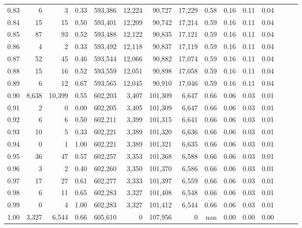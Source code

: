 \begin{tabular}{rrrrrrrrrrrrrrr}
0.83 &       6 &       3 &  0.33 &  593,386 &   12,224 &   90,727 &   17,229 &  0.58 &  0.16 &  0.11 &      0.04 \\
0.84 &      15 &      15 &  0.50 &  593,401 &   12,209 &   90,742 &   17,214 &  0.59 &  0.16 &  0.11 &      0.04 \\
0.85 &      87 &      93 &  0.52 &  593,488 &   12,122 &   90,835 &   17,121 &  0.59 &  0.16 &  0.11 &      0.04 \\
0.86 &       4 &       2 &  0.33 &  593,492 &   12,118 &   90,837 &   17,119 &  0.59 &  0.16 &  0.11 &      0.04 \\
0.87 &      52 &      45 &  0.46 &  593,544 &   12,066 &   90,882 &   17,074 &  0.59 &  0.16 &  0.11 &      0.04 \\
0.88 &      15 &      16 &  0.52 &  593,559 &   12,051 &   90,898 &   17,058 &  0.59 &  0.16 &  0.11 &      0.04 \\
0.89 &       6 &      12 &  0.67 &  593,565 &   12,045 &   90,910 &   17,046 &  0.59 &  0.16 &  0.11 &      0.04 \\
0.90 &   8,638 &  10,399 &  0.55 &  602,203 &    3,407 &  101,309 &    6,647 &  0.66 &  0.06 &  0.03 &      0.01 \\
0.91 &       2 &       0 &  0.00 &  602,205 &    3,405 &  101,309 &    6,647 &  0.66 &  0.06 &  0.03 &      0.01 \\
0.92 &       6 &       6 &  0.50 &  602,211 &    3,399 &  101,315 &    6,641 &  0.66 &  0.06 &  0.03 &      0.01 \\
0.93 &      10 &       5 &  0.33 &  602,221 &    3,389 &  101,320 &    6,636 &  0.66 &  0.06 &  0.03 &      0.01 \\
0.94 &       0 &       1 &  1.00 &  602,221 &    3,389 &  101,321 &    6,635 &  0.66 &  0.06 &  0.03 &      0.01 \\
0.95 &      36 &      47 &  0.57 &  602,257 &    3,353 &  101,368 &    6,588 &  0.66 &  0.06 &  0.03 &      0.01 \\
0.96 &       3 &       2 &  0.40 &  602,260 &    3,350 &  101,370 &    6,586 &  0.66 &  0.06 &  0.03 &      0.01 \\
0.97 &      17 &      27 &  0.61 &  602,277 &    3,333 &  101,397 &    6,559 &  0.66 &  0.06 &  0.03 &      0.01 \\
0.98 &       6 &      11 &  0.65 &  602,283 &    3,327 &  101,408 &    6,548 &  0.66 &  0.06 &  0.03 &      0.01 \\
0.99 &       0 &       4 &  1.00 &  602,283 &    3,327 &  101,412 &    6,544 &  0.66 &  0.06 &  0.03 &      0.01 \\
1.00 &   3,327 &   6,544 &  0.66 &  605,610 &        0 &  107,956 &        0 &   nan &  0.00 &  0.00 &      0.00 \\
\bottomrule
\end{tabular}
